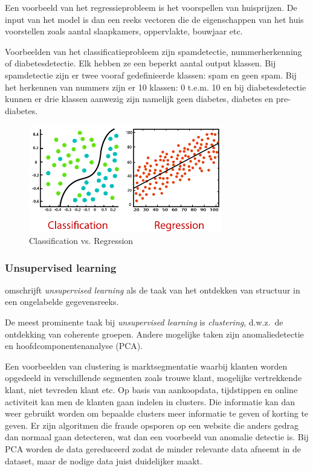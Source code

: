 Een voorbeeld van het regressieprobleem is het voorspellen van huisprijzen. De input van het model is dan een reeks vectoren die de eigenschappen van het huis voorstellen zoals aantal slaapkamers, oppervlakte, bouwjaar etc.

Voorbeelden van het classificatieprobleem zijn spamdetectie, nummerherkenning of diabetesdetectie. Elk hebben ze een beperkt aantal output klassen. Bij spamdetectie zijn er twee vooraf gedefinieerde klassen: spam en geen spam. Bij het herkennen van nummers zijn er 10 klassen: 0 t.e.m. 10 en bij diabetesdetectie kunnen er drie klassen aanwezig zijn namelijk geen diabetes, diabetes en pre-diabetes.

\begin{figure}
    \centering
    \includegraphics[width=0.75\textwidth]{./img/classification_regression}
    \caption{\label{fig:classification_vs_regression} Classification vs. Regression~\autocite{JavaTpoint2021}}
\end{figure}

\subsubsection{Unsupervised learning}
\textcite{Lievens2021} omschrijft \textit{unsupervised learning} als de taak van het ontdekken van structuur in een ongelabelde gegevensreeks.

De meest prominente taak bij \textit{unsupervised learning} is \textit{clustering}, d.w.z.\ de ontdekking van coherente
groepen. Andere mogelijke taken zijn anomaliedetectie en hoofdcomponentenanalyse (PCA).

Een voorbeelden van clustering is marktsegmentatie waarbij klanten worden opgedeeld in verschillende segmenten zoals trouwe klant, mogelijke vertrekkende klant, niet tevreden klant etc. Op basis van aankoopdata, tijdstippen en online activiteit kan men de klanten gaan indelen in clusters. Die informatie kan dan weer gebruikt worden om bepaalde clusters meer informatie te geven of korting te geven.
Er zijn algoritmen die fraude opsporen op een website die anders gedrag dan normaal gaan detecteren, wat dan een voorbeeld van anomalie detectie is.
Bij PCA worden de data gereduceerd zodat de minder relevante data afneemt in de dataset, maar de nodige data juist duidelijker maakt.



